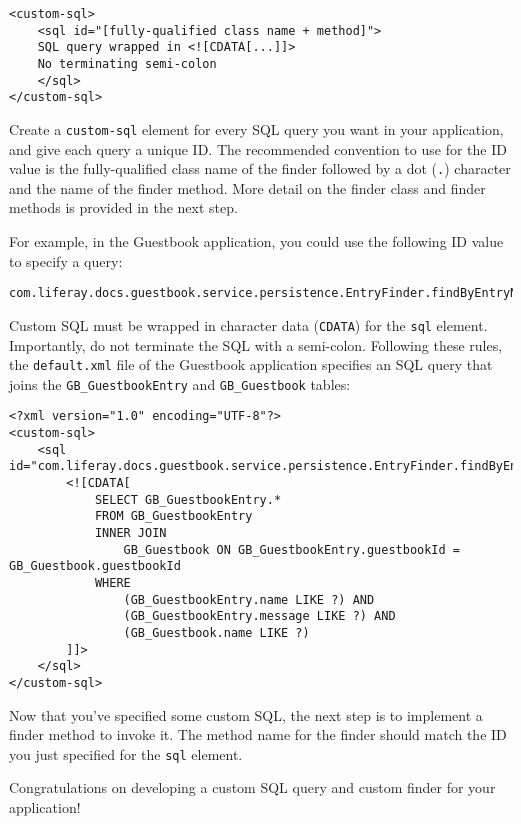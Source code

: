 \begin{verbatim}
<custom-sql>
    <sql id="[fully-qualified class name + method]">
    SQL query wrapped in <![CDATA[...]]>
    No terminating semi-colon
    </sql>
</custom-sql>
\end{verbatim}

Create a \texttt{custom-sql} element for every SQL query you want in
your application, and give each query a unique ID. The recommended
convention to use for the ID value is the fully-qualified class name of
the finder followed by a dot (\texttt{.}) character and the name of the
finder method. More detail on the finder class and finder methods is
provided in the next step.

For example, in the Guestbook application, you could use the following
ID value to specify a query:

\begin{verbatim}
com.liferay.docs.guestbook.service.persistence.EntryFinder.findByEntryNameEntryMessageGuestbookName
\end{verbatim}

Custom SQL must be wrapped in character data (\texttt{CDATA}) for the
\texttt{sql} element. Importantly, do not terminate the SQL with a
semi-colon. Following these rules, the \texttt{default.xml} file of the
Guestbook application specifies an SQL query that joins the
\texttt{GB\_GuestbookEntry} and \texttt{GB\_Guestbook} tables:

\begin{verbatim}
<?xml version="1.0" encoding="UTF-8"?>
<custom-sql>
    <sql id="com.liferay.docs.guestbook.service.persistence.EntryFinder.findByEntryNameEntryMessageGuestbookName">
        <![CDATA[
            SELECT GB_GuestbookEntry.*
            FROM GB_GuestbookEntry
            INNER JOIN 
                GB_Guestbook ON GB_GuestbookEntry.guestbookId = GB_Guestbook.guestbookId
            WHERE
                (GB_GuestbookEntry.name LIKE ?) AND
                (GB_GuestbookEntry.message LIKE ?) AND
                (GB_Guestbook.name LIKE ?)
        ]]>
    </sql>
</custom-sql>
\end{verbatim}

Now that you've specified some custom SQL, the next step is to implement
a finder method to invoke it. The method name for the finder should
match the ID you just specified for the \texttt{sql} element.

Congratulations on developing a custom SQL query and custom finder for
your application!

